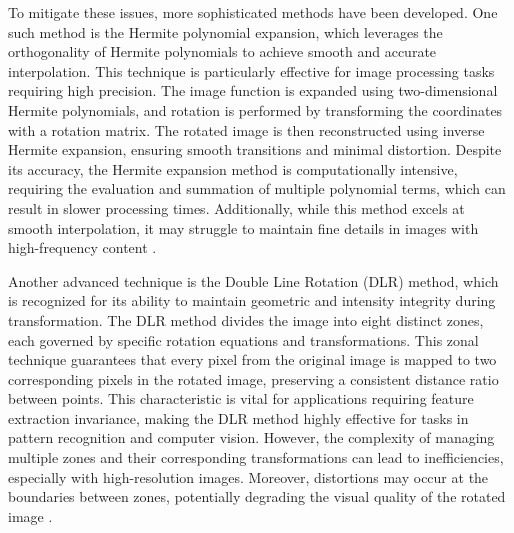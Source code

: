 \documentclass[conference]{IEEEtran}
\begin{document}
To mitigate these issues, more sophisticated methods have been developed. One such method is the Hermite polynomial expansion, which leverages the orthogonality of Hermite polynomials to achieve smooth and accurate interpolation. This technique is particularly effective for image processing tasks requiring high precision. The image function is expanded using two-dimensional Hermite polynomials, and rotation is performed by transforming the coordinates with a rotation matrix. The rotated image is then reconstructed using inverse Hermite expansion, ensuring smooth transitions and minimal distortion. Despite its accuracy, the Hermite expansion method is computationally intensive, requiring the evaluation and summation of multiple polynomial terms, which can result in slower processing times. Additionally, while this method excels at smooth interpolation, it may struggle to maintain fine details in images with high-frequency content \cite{park2009accurate}.

Another advanced technique is the Double Line Rotation (DLR) method, 
which is recognized for its ability to maintain geometric and intensity 
integrity during transformation. The DLR method divides the image into eight 
distinct zones, each governed by specific rotation equations and transformations. 
This zonal technique guarantees that every pixel from the original image is mapped to two 
corresponding pixels in the rotated image, preserving a consistent distance ratio between 
points. This characteristic is vital for applications requiring feature extraction invariance, 
making the DLR method highly effective for tasks in pattern recognition and computer vision. 
However, the complexity of managing multiple zones and their corresponding transformations can lead to inefficiencies, especially with high-resolution images. Moreover, distortions may occur at the boundaries between zones, potentially degrading the visual quality of the rotated image \cite{ashtari2015double}.

\end{document}
